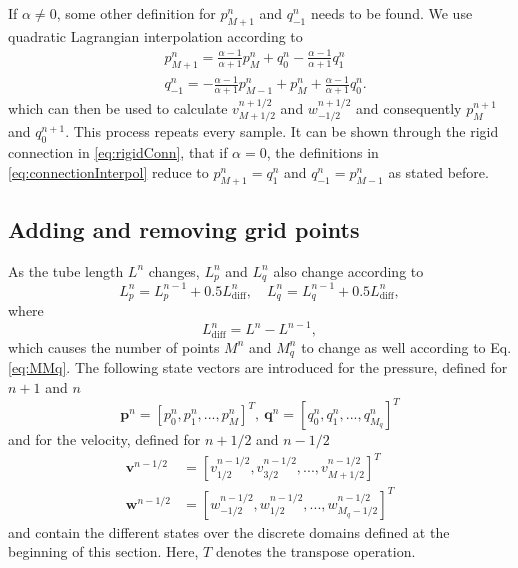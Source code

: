 %
If $\alpha \neq 0$, some other definition for $p_{M+1}^n$ and $q_{-1}^n$ needs to be found. We use quadratic Lagrangian interpolation according to
\begin{subequations}\label{eq:connectionInterpol}
\begin{align}
        &p_{M+1}^n = \frac{\alpha - 1}{\alpha + 1}p_{M}^n + q_0^n - \frac{\alpha - 1}{\alpha + 1}q_1^n
    \label{eq:calcPMp1}\\
        &q_{-1}^n
        =-\frac{\alpha - 1}{\alpha + 1}p_{M-1}^n + p_{M}^n+ \frac{\alpha - 1}{\alpha + 1}q_{0}^n.\label{eq:calcQm1}
\end{align}
\end{subequations}
which can then be used to calculate $v_{M+1/2}^{n+1/2}$ and $w_{-1/2}^{n+1/2}$ and consequently $p_M^{n+1}$ and $q_0^{n+1}$. This process repeats every sample. It can be shown through the rigid connection in \eqref{eq:rigidConn}, that if $\alpha=0$, the definitions in \eqref{eq:connectionInterpol} reduce to $p_{M+1}^n = q_1^n$ and $q_{-1}^n = p_{M-1}^n$ as stated before.

\subsection{Adding and removing grid points}\label{sec:addRemove}
As the tube length $L^n$ changes, $L_p^n$ and $L_q^n$ also change according to
\begin{equation}
    L_p^n = L_p^{n-1} + 0.5 L_\text{diff}^n, \quad L_q^n =  L_q^{n-1} + 0.5L_\text{diff}^n,\label{eq:updateLs} 
\end{equation}
where
\begin{equation}
    L_\text{diff}^n = L^n-L^{n-1},\label{eq:lDiff}
\end{equation}
which causes the number of points $M^n$ and $M_q^n$ to change as well according to Eq. \eqref{eq:MMq}. The following state vectors are introduced for the pressure, defined for $n+1$ and $n$ 
\begin{equation}
    \mathbf{p}^n = [p_0^n, p_1^n, ..., p_M^n]^T,\ \mathbf{q}^n = [q_0^n, q_1^n, ..., q_{M_q}^n]^T
\end{equation}
and for the velocity, defined for $n+1/2$ and $n-1/2$
\begin{equation}
    \begin{aligned}
        \mathbf{v}^{n-1/2} &=  [v_{1/2}^{n-1/2}, v_{3/2}^{n-1/2}, ..., v_{M+1/2}^{n-1/2}]^T\\
        \mathbf{w}^{n-1/2} &=  [w_{-1/2}^{n-1/2}, w_{1/2}^{n-1/2}, ..., w_{M_q-1/2}^{n-1/2}]^T
    \end{aligned}
\end{equation}
and contain the different states over the discrete domains defined at the beginning of this section. Here, $T$ denotes the transpose operation.

